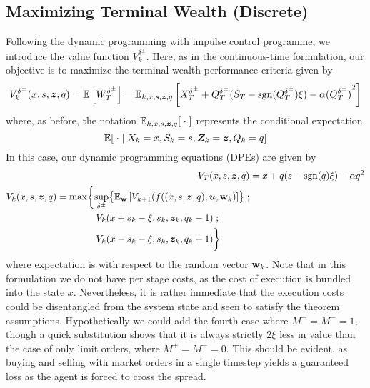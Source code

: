 \subsection{Maximizing Terminal Wealth (Discrete)}
Following the dynamic programming with impulse control programme, we introduce the value function $V_k^{\delta^\pm}$. Here, as in the continuous-time formulation, our objective is to maximize the terminal wealth performance criteria given by
\begin{equation}
V_k^{\delta^\pm} (x,s,\bm{z},q) = \mathbb{E} \left[ W_T^{\delta^\pm} \right] = \mathbb{E}_{k,x,s,\bm{z},q}\left[ X_T^{\delta^\pm} + Q_T^{\delta^\pm}(S_T - \operatorname{\mathrm{sgn}}(Q_T^{\delta^\pm})\xi) - \alpha {(Q_T^{\delta^\pm})}^2 \right]
\end{equation}
where, as before, the notation $\mathbb{E}_{k,x,s,\bm{z},q}[ \; \cdot \; ]$ represents the conditional expectation
\[ \mathbb{E} [ \; \cdot \; | \; X_k = x, S_k = s, \bm{Z}_k = \bm{z}, Q_k = q] \]
In this case, our dynamic programming equations (DPEs) are given by
\begin{align}
V_T (x,s,\bz,q) & = x + q(s-\sgn(q)\xi) - \alpha q^2 \\
\label{eq:discreteDPEinitial}
\begin{split}
V_k (x,s,\bz,q) & = \max \biggl\lbrace \sup_{\delta^\pm} \bigl\lbrace \E_{\bw} \left[ V_{k+1} (f((x,s,\bz,q),\bu,\bw_k) \right] \bigr\rbrace \; ; \\
& \hphantom{{}={} \max \biggl\lbrace} V_k(x+s_k-\xi,s_k, \bz_k, q_k -1) \; ; \\
& \hphantom{{}={} \max \biggl\lbrace} V_k(x-s_k-\xi,s_k, \bz_k, q_k +1) \biggr\rbrace
\end{split}
\end{align}
where expectation is with respect to the random vector $\mathbf{w}_k$. Note that in this formulation we do not have per stage costs, as the cost of execution is bundled into the state $x$. Nevertheless, it is rather immediate that the execution costs could be disentangled from the system state and seen to satisfy the theorem assumptions. Hypothetically we could add the fourth case where $M^+ = M^- = 1$, though a quick substitution shows that it is always strictly $2\xi$ less in value than the case of only limit orders, where $M^+ = M^- = 0$. This should be evident, as buying and selling with market orders in a single timestep yields a guaranteed loss as the agent is forced to cross the spread. 

